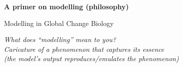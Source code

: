 \documentclass[xcolor={usenames,x11names},compress]{beamer}
\renewcommand{\(}{\begin{columns}}
\renewcommand{\)}{\end{columns}}
\newcommand{\<}[1]{\begin{column}{#1}}
\renewcommand{\>}{\end{column}}
\begin{document}
\begin{frame}[plain]{}
  
\begin{center}
  {\LARGE \bf A primer on modelling (philosophy)}
\end{center}  

\end{frame}


\begin{frame}{Modelling in Global Change Biology}

	\begin{center}

    \it What does ``modelling'' mean to you?\\
    \vspace{20pt}
    \pause 
    Caricature of a phenomenon that captures its essence \\ (the model's output reproduces/emulates the phenomenon)
		
  \end{center}
\end{frame}
  
\end{document}
